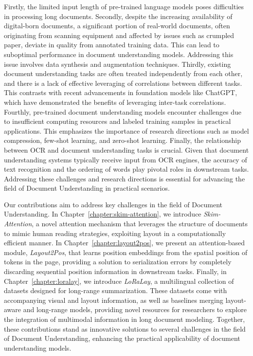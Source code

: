 Firstly, the limited input length of pre-trained language models poses difficulties in processing long documents. Secondly, despite the increasing availability of digital-born documents, a significant portion of real-world documents, often originating from scanning equipment and affected by issues such as crumpled paper, deviate in quality from annotated training data. This can lead to suboptimal performance in document understanding models. Addressing this issue involves data synthesis and augmentation techniques. Thirdly, existing document understanding tasks are often treated independently from each other, and there is a lack of effective leveraging of correlations between different tasks. This contrasts with recent advancements in foundation models like ChatGPT, which have demonstrated the benefits of leveraging inter-task correlations. Fourthly, pre-trained document understanding models encounter challenges due to insufficient computing resources and labeled training samples in practical applications. This emphasizes the importance of research directions such as model compression, few-shot learning, and zero-shot learning. Finally, the relationship between \ac{OCR} and document understanding tasks is crucial. Given that document understanding systems typically receive input from \ac{OCR} engines, the accuracy of text recognition and the ordering of words play pivotal roles in downstream tasks. Addressing these challenges and research directions is essential for advancing the field of Document Understanding in practical scenarios.

Our contributions aim to address key challenges in the field of Document Understanding. In Chapter~\ref{chapter:skim-attention}, we introduce \textit{Skim-Attention}, a novel attention mechanism that leverages the structure of documents to mimic human reading strategies, exploiting layout in a computationally efficient manner. In Chapter~\ref{chapter:layout2pos}, we present an attention-based module, \textit{Layout2Pos}, that learns position embeddings from the spatial position of tokens in the page, providing a solution to serialization errors by completely discarding sequential position information in downstream tasks. Finally, in Chapter~\ref{chapter:loralay}, we introduce \textit{LoRaLay}, a multilingual collection of datasets designed for long-range summarization. These datasets come with accompanying visual and layout information, as well as baselines merging layout-aware and long-range models, providing novel resources for researchers to explore the integration of multimodal information in long document modeling. Together, these contributions stand as innovative solutions to several challenges in the field of Document Understanding, enhancing the practical applicability of document understanding models.


\acresetall
